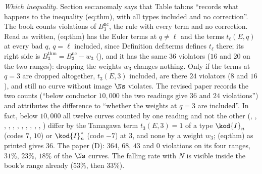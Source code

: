 \begin{sloppypar}
\begin{example}
\emph{Which inequality.} Section sec:anomaly says that Table tab:ns ``records what happens to the inequality (eq:thm), with all types included and no
correction''. The book counts violations of $B^{\mathrm{nc}}_3$, the rule with every term and no correction. Read as written, (eq:thm) has the Euler terms at $q\ne\ell$
and the terms $t_\ell(E,q)$ at every bad $q$, $q=\ell$ included, since Definition def:terms defines $t_\ell$ there; its right side is
$B^{\mathrm{thm}}_3=B^{\mathrm{nc}}_3-w_3$ (), and it has the same $36$ violators ($16$ and $20$ on the two ranges): dropping the
weights $w_3$ changes nothing. Only if the terms at $q=3$ are dropped altogether, $t_3(E,3)$ included, are there $24$ violators ($8$ and $16$), and still no
curve without image $\Ns$ violates. The revised paper records the two counts (``below conductor $10{,}000$ the two readings give $36$ and $24$ violations'')
and attributes the difference to ``whether the weights at $q=3$ are included''. In fact, below $10{,}000$ all twelve curves counted by one reading and
not the other (, , , , , , , , , ,
, ) differ by the Tamagawa term $t_3(E,3)=1$ of a type $\kod{I}_n$ (codes $7$, $10$) or $\kod{I}_n^*$ (code $-7$) at $3$, and none by a
weight $w_3$; (eq:thm) as printed gives $36$. The paper (D): $364$, $68$, $43$ and $0$ violations on its four ranges,
$31\%$, $23\%$, $18\%$ of the $\Ns$ curves. The falling rate with $N$ is visible inside the book's range already ($53\%$, then $33\%$).
\end{example}


\end{sloppypar}
